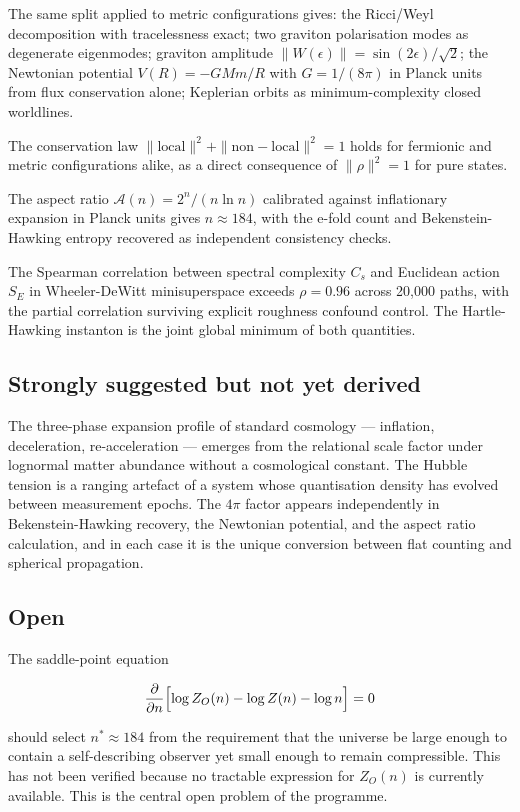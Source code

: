 The same split applied to metric configurations gives: the Ricci/Weyl
decomposition with tracelessness exact; two graviton polarisation modes
as degenerate eigenmodes; graviton amplitude $\|W(\epsilon)\| =
\sin(2\epsilon)/\sqrt{2}$; the Newtonian potential $V(R) = -GMm/R$
with $G = 1/(8\pi)$ in Planck units from flux conservation alone;
Keplerian orbits as minimum-complexity closed worldlines.

The conservation law $\|\mathrm{local}\|^2 + \|\mathrm{non-local}\|^2
= 1$ holds for fermionic and metric configurations alike, as a direct
consequence of $\|\rho\|^2 = 1$ for pure states.

The aspect ratio $\mathcal{A}(n) = 2^n/(n\ln n)$ calibrated against
inflationary expansion in Planck units gives $n \approx 184$, with the
e-fold count and Bekenstein-Hawking entropy recovered as independent
consistency checks.

The Spearman correlation between spectral complexity $C_s$ and
Euclidean action $S_E$ in Wheeler-DeWitt minisuperspace exceeds
$\rho = 0.96$ across 20,000 paths, with the partial correlation
surviving explicit roughness confound control. The Hartle-Hawking
instanton is the joint global minimum of both quantities.

\subsection*{Strongly suggested but not yet derived}

The three-phase expansion profile of standard cosmology --- inflation,
deceleration, re-acceleration --- emerges from the relational scale
factor under lognormal matter abundance without a cosmological constant.
The Hubble tension is a ranging artefact of a system whose
quantisation density has evolved between measurement epochs. The
$4\pi$ factor appears independently in Bekenstein-Hawking recovery, the
Newtonian potential, and the aspect ratio calculation, and in each case
it is the unique conversion between flat counting and spherical
propagation.

\subsection*{Open}

The saddle-point equation

\[
\frac{\partial}{\partial n}
\Bigl[\log Z_O(n) - \log Z(n) - \log n\Bigr] = 0
\]

should select $n^* \approx 184$ from the requirement that the universe
be large enough to contain a self-describing observer yet small enough
to remain compressible. This has not been verified because no tractable
expression for $Z_O(n)$ is currently available. This is the central
open problem of the programme.

